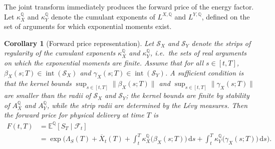 \documentclass[10pt,a4paper,reqno]{amsart}
\newtheorem{corollary}[theorem]{Corollary}
\newcommand{\E}{\mathbb{E}}
\newcommand{\Q}{\mathbb{Q}}
\newcommand{\F}{\mathcal{F}}
\newcommand{\1}{\mathbbm{1}}
\newcommand{\dd}{\mathrm{d}}
\begin{document}
The joint transform immediately produces the forward price of the energy factor.
Let $\kappa_X^\Q$ and $\kappa_Y^\Q$ denote the cumulant exponents of
$L^{X,\Q}$ and $L^{Y,\Q}$, defined on the set of arguments for which
exponential moments exist.

\begin{corollary}[Forward price representation]
\label{cor:forward_price}
Let $\mathcal{S}_X$ and $\mathcal{S}_Y$ denote the strips of regularity of
the cumulant exponents $\kappa_X^\Q$ and $\kappa_Y^\Q$, i.e.\ the sets of
real arguments on which the exponential moments are finite. Assume that for
all $s \in [t,T]$, $\beta_X(s;T) \in \operatorname{int}(\mathcal{S}_X)$
and $\gamma_X(s;T) \in \operatorname{int}(\mathcal{S}_Y)$. A sufficient
condition is that the kernel bounds
$\sup_{s \in [t,T]}\|\beta_X(s;T)\|$ and
$\sup_{s \in [t,T]}\|\gamma_X(s;T)\|$ are smaller than the radii of
$\mathcal{S}_X$ and $\mathcal{S}_Y$; the kernel bounds are finite by
stability of $A_X^\Q$ and $A_Y^\Q$, while the strip radii are determined
by the Lévy measures.
Then the forward price for physical delivery at time $T$ is
\begin{align}
  F(t,T)
  &= \E^\Q[S_T \mid \F_t] \nonumber\\
  &= \exp\Bigg(
      \Lambda_S(T)
      + \overline{X}_t(T)
      + \int_t^T \kappa_X^\Q\!\big(\beta_X(s;T)\big)\,\dd s
      + \int_t^T \kappa_Y^\Q\!\big(\gamma_X(s;T)\big)\,\dd s
    \Bigg).
    \label{eq:forward_formula}
\end{align}
\end{corollary}
\end{document}
